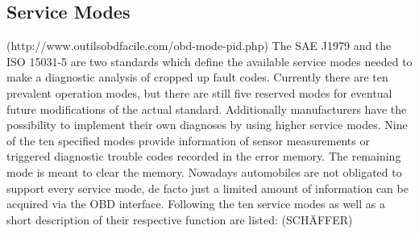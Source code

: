 \subsection{Service Modes}
(http://www.outilsobdfacile.com/obd-mode-pid.php)
The SAE J1979 and the ISO 15031-5 are two standards which define the available service modes needed to make a diagnostic analysis of cropped up fault codes. Currently there are ten prevalent operation modes, but there are still five reserved modes for eventual future modifications of the actual standard. Additionally manufacturers have the possibility to implement their own diagnoses by using higher service modes.
Nine of the ten specified modes provide information of sensor measurements or triggered diagnostic trouble codes recorded in the error memory. The remaining mode is meant to clear the memory. Nowadays automobiles are not obligated to support every service  mode, de facto just a limited amount of information can be acquired via the OBD interface.
Following the ten service modes as well as a short description of their respective function are listed: (SCHÄFFER)
